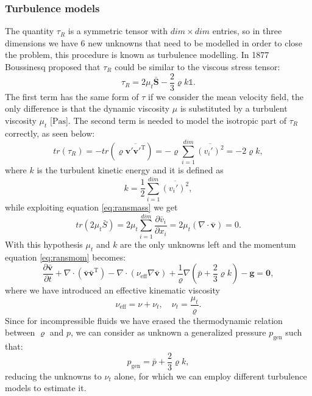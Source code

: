 \subsubsection{Turbulence models}
The quantity $\tau_R$ is a symmetric tensor with $dim \times dim$ entries, so 
in three 
dimensions we have 6 new unknowns that need to be modelled in order to close 
the problem, this procedure is known as turbulence modelling.
In 1877 Boussinesq proposed that $\tau_R$ could be similar to the viscous 
stress tensor:
\begin{equation} \label{eq:bouss}
\tau_R = 2\mu_t \bar{\mathbf{S}} - 
\frac{2}{3}\varrho k \mathbb{1}.
\end{equation}
The first term has the same form of $\tau$ if we consider the mean velocity 
field, 
the only difference is that the dynamic viscosity $\mu$ is substituted by a 
turbulent viscosity $\mu_t$ [$\si{\pascal \second}$]. The second term is needed 
to model the isotropic part of $\tau_R$ correctly, as seen below:
\begin{equation} \label{eq:tracciatau}
tr(\tau_R) = -tr(\varrho \overline{\mathbf{v}' {\mathbf{v}'}^\mathrm{T}}) = 
-\varrho \sum_{i=1}^{dim} \overline{(v_i')^2} = -2\varrho k,
\end{equation}
where $k$ is the turbulent kinetic energy and it is defined as
\begin{equation}
k = \frac{1}{2} \sum_{i=1}^{dim} \overline{(v_i')^2},
\end{equation}
while exploiting equation \eqref{eq:ransmass} we get
\begin{equation}
	tr(2\mu_t \bar{S}) = 2 \mu_t \sum_{i=1}^{dim} \frac{\partial 
	\bar{v}_i}{\partial x_i} = 2\mu_t (\nabla \cdot \bar{\mathbf{v}}) = 0.
\end{equation}
With this hypothesis $\mu_t$ and $k$ are the only unknowns left and the 
momentum equation \eqref{eq:ransmom} becomes:
\begin{equation} \label{eq:ransmom2}
\frac{\partial \bar{\mathbf{v}}}{\partial t} + \nabla 
\cdot ( \bar{\mathbf{v}} \bar{\mathbf{v}}^\mathrm{T}) - \nabla \cdot 
(\nu_\text{eff} \nabla \bar{\mathbf{v}}) + \frac{1}{\varrho}\nabla (\bar{p} + 
\frac{2}{3}\varrho k) - \mathbf{g} = \mathbf{0},
\end{equation}
where we have introduced an effective kinematic viscosity
\begin{equation}
	\nu_\text{eff} = \nu + \nu_t, \quad \nu_t = \frac{\mu_t}{\varrho}.
\end{equation}
Since for incompressible fluids we have erased the thermodynamic relation 
between $\varrho$ and $p$, we can consider as unknown a generalized pressure 
$p_\text{gen}$ such that:
\begin{equation}
p_\text{gen} = \bar{p} + \frac{2}{3}\varrho k,
\end{equation}
reducing the unknowns to $\nu_t$ alone, for which we can employ different 
turbulence models to estimate it.

